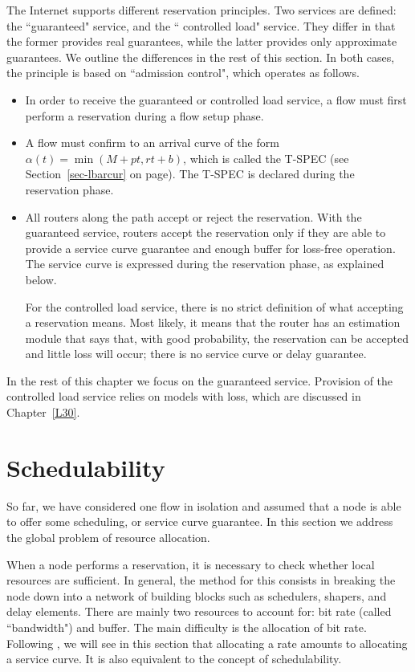 The Internet supports different reservation principles. Two
services are defined: the ``guaranteed"
service, and the `` controlled load" service. They differ in that the former provides real
guarantees, while the latter provides only approximate guarantees.
We outline the differences in the rest of this section. In both
cases, the principle is based on ``admission control", which
operates as follows.
\begin{itemize}
  \item In order to receive the guaranteed or
controlled load service, a flow must first perform a reservation
during a flow setup phase.
  \item A flow must confirm to an arrival curve of the form
  $\alpha(t) = \min(M+pt, rt+b)$, which is called the T-SPEC (see
  Section~\ref{sec-lbarcur} on page\pageref{eq-tspec}). The T-SPEC
  is declared during the reservation phase.
  \item All routers along the path accept or reject the
  reservation. With the guaranteed service, routers accept
  the reservation only if they are able to provide a service curve
  guarantee and enough buffer for loss-free operation. The service
  curve is expressed during the reservation phase, as explained
  below.

  For the
  controlled load service, there is no strict definition of what
  accepting a reservation means. Most likely, it means that the
  router has an estimation module that says that, with good
  probability, the reservation can be accepted and little loss
  will occur; there is no service curve or delay guarantee.
\end{itemize}

In the rest of this chapter we focus on the guaranteed service.
Provision of the controlled load service relies on models with
loss, which are discussed in Chapter~\ref{L30}.


\section{Schedulability}

So far, we have considered one flow in isolation and assumed that
a node is able to offer some scheduling, or service curve
guarantee. In this section we address the global problem of
resource allocation.

When a node performs a reservation, it is necessary to check
whether local resources are sufficient. In general, the method for
this consists in breaking the node down into a network of building
blocks such as schedulers, shapers, and delay elements. There are
mainly two resources to account for: bit rate (called
``bandwidth") and buffer. The main difficulty is the allocation of
bit rate. Following \cite{scp95}, we will see in this section that
allocating a rate amounts to allocating a service curve. It is
also equivalent to the concept of schedulability.


